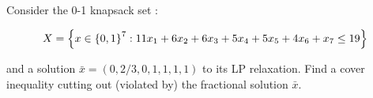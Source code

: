 Consider the 0-1 knapsack set :

$$X = \left\{ x \in \left\{ 0,1 \right \}^7 : 11x_1 + 6x_2 + 6x_3 + 5x_4 + 5x_5 + 4x_6 + x_7 \leq 19 \right \}$$

and a solution $\bar{x} = (0, 2/3, 0, 1, 1, 1, 1)$ to its LP relaxation. Find a cover inequality cutting out (violated by) the fractional solution $\bar{x}$.